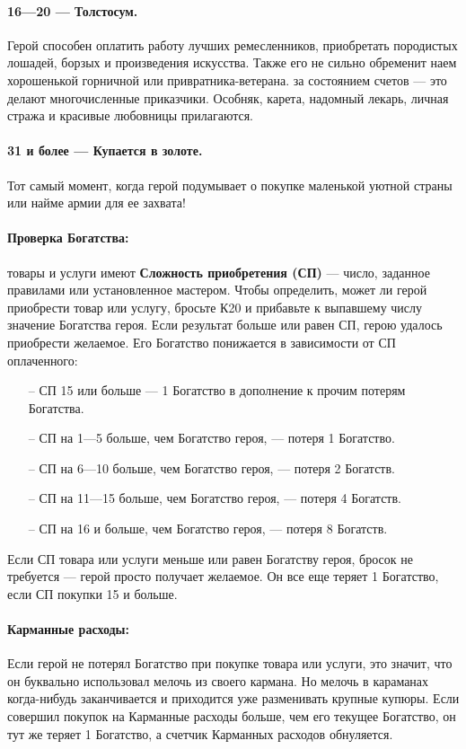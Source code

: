 \paragraph{16—20 — Толстосум.} Герой способен оплатить работу лучших ремесленников, приобретать породистых лошадей, борзых и произведения искусства. Также его не сильно обременит наем хорошенькой горничной или привратника-ветерана. за состоянием счетов — это делают многочисленные приказчики. Особняк, карета, надомный лекарь, личная стража и красивые любовницы прилагаются.
\paragraph{31 и более — Купается в золоте.} Тот самый момент, когда герой подумывает о покупке маленькой уютной страны или найме армии для ее захвата!
\paragraph{Проверка Богатства:} товары и услуги имеют \textbf{Сложность приобретения (СП)} — число, заданное правилами или установленное мастером. Чтобы определить, может ли герой приобрести товар или услугу, бросьте К20 и прибавьте к выпавшему числу значение Богатства героя. Если результат больше или равен СП, герою удалось приобрести желаемое. Его Богатство понижается в зависимости от СП оплаченного:
\begin{itemize}
\item[--] СП 15 или больше — 1 Богатство в дополнение к прочим потерям
Богатства.
\item[--] СП на 1—5 больше, чем Богатство героя, — потеря 1 Богатство.
\item[--] СП на 6—10 больше, чем Богатство героя, — потеря 2 Богатств.
\item[--] СП на 11—15 больше, чем Богатство героя, — потеря 4 Богатств.
\item[--] СП на 16 и больше, чем Богатство героя, — потеря 8 Богатств.
\end{itemize}
Если СП товара или услуги меньше или равен Богатству героя, бросок не требуется — герой просто получает желаемое. Он все еще теряет 1 Богатство, если СП покупки 15 и больше. 
\paragraph{Карманные расходы:}
Если герой не потерял Богатство при покупке товара или услуги, это значит, что он буквально использовал мелочь из своего кармана. Но мелочь в караманах когда-нибудь заканчивается и приходится уже разменивать крупные купюры. Если совершил покупок на Карманные расходы больше, чем его текущее Богатство, он тут же теряет 1 Богатство, а счетчик Карманных расходов обнуляется.

